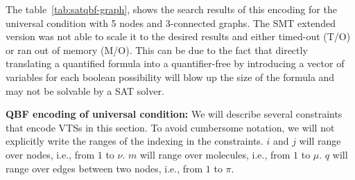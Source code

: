 
%
The table~\ref{tab:satqbf-graph}, shows the search results of this encoding for the universal condition with 5 nodes and 3-connected graphs. 
%
The SMT extended version was not able to scale it to the desired results and either timed-out (T/O) or ran out of memory (M/O).
%
This can be due to the fact that directly translating a quantified formula into a quantifier-free  by introducing a vector of variables for each boolean possibility will blow up the size of the formula and may not be solvable by a SAT solver.

\textbf{QBF encoding of universal condition:}
We will describe several constraints that encode VTSs in this section.
%
To avoid cumbersome notation, we will not explicitly write the ranges
of the indexing in the constraints.
%
$i$ and $j$ will range over nodes, i.e., from $1$ to $\nu$.
%
$m$ will range over molecules, i.e., from $1$ to $\mu$.
%
$q$ will range over edges between two nodes, i.e., from $1$ to $\pi$.
%

